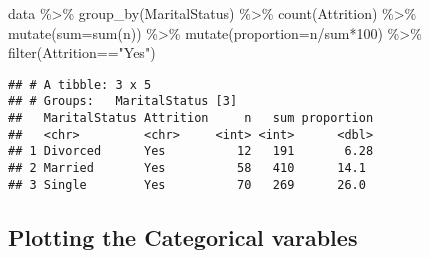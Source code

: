 \documentclass[
]{article}
\newenvironment{Shaded}{\begin{snugshade}}{\end{snugshade}}
\newcommand{\AttributeTok}[1]{\textcolor[rgb]{0.77,0.63,0.00}{#1}}
\newcommand{\DecValTok}[1]{\textcolor[rgb]{0.00,0.00,0.81}{#1}}
\newcommand{\FunctionTok}[1]{\textcolor[rgb]{0.00,0.00,0.00}{#1}}
\newcommand{\NormalTok}[1]{#1}
\newcommand{\OtherTok}[1]{\textcolor[rgb]{0.56,0.35,0.01}{#1}}
\newcommand{\SpecialCharTok}[1]{\textcolor[rgb]{0.00,0.00,0.00}{#1}}
\newcommand{\StringTok}[1]{\textcolor[rgb]{0.31,0.60,0.02}{#1}}
\begin{document}
\begin{Shaded}
\begin{Highlighting}[]
\NormalTok{data }\SpecialCharTok{\%\textgreater{}\%} \FunctionTok{group\_by}\NormalTok{(MaritalStatus) }\SpecialCharTok{\%\textgreater{}\%} 
  \FunctionTok{count}\NormalTok{(Attrition) }\SpecialCharTok{\%\textgreater{}\%} 
  \FunctionTok{mutate}\NormalTok{(}\AttributeTok{sum=}\FunctionTok{sum}\NormalTok{(n)) }\SpecialCharTok{\%\textgreater{}\%} 
  \FunctionTok{mutate}\NormalTok{(}\AttributeTok{proportion=}\NormalTok{n}\SpecialCharTok{/}\NormalTok{sum}\SpecialCharTok{*}\DecValTok{100}\NormalTok{) }\SpecialCharTok{\%\textgreater{}\%} 
  \FunctionTok{filter}\NormalTok{(Attrition}\SpecialCharTok{==}\StringTok{"Yes"}\NormalTok{)}
\end{Highlighting}
\end{Shaded}

\begin{verbatim}
## # A tibble: 3 x 5
## # Groups:   MaritalStatus [3]
##   MaritalStatus Attrition     n   sum proportion
##   <chr>         <chr>     <int> <int>      <dbl>
## 1 Divorced      Yes          12   191       6.28
## 2 Married       Yes          58   410      14.1 
## 3 Single        Yes          70   269      26.0
\end{verbatim}

\hypertarget{plotting-the-categorical-varables}{%
\subsection{Plotting the Categorical
varables}\label{plotting-the-categorical-varables}}

\begin{Shaded}
\end{Shaded}
\end{document}
